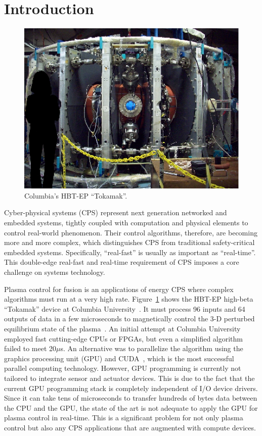 \section{Introduction}
\label{sec:introduction}

\begin{figure}[t]
 \centering
 \includegraphics[width=0.82\hsize]{eps/tokamak.eps}
 \caption{Columbia's HBT-EP ``Tokamak''.}
 \label{fig:tokamak}
\end{figure}

Cyber-physical systems (CPS) represent next generation networked and
embedded systems, tightly coupled with computation and physical
elements to control real-world phenomenon.
Their control algorithms, therefore, are becoming more and more complex,
which distinguishes CPS from traditional safety-critical embedded
systems.
Specifically, ``real-fast'' is usually as important as ``real-time''.
This double-edge real-fast and real-time requirement of CPS imposes a
core challenge on systems technology.

Plasma control for fusion is an applications of energy CPS where
complex algorithms must run at a very high rate.
Figure~\ref{fig:tokamak} shows the HBT-EP high-beta ``Tokamak'' device at
Columbia University~\cite{Maurer_PPCF11,Rath_FED12}.
It must process 96 inputs and 64 outputs of data in a few microseconds
to magnetically control the 3-D perturbed equilibrium state of the
plasma~\cite{Boozer_PP99}.
An initial attempt at Columbia University employed fast cutting-edge
CPUs or FPGAs, but even a simplified algorithm failed to meet 20$\mu$s.
An alternative was to parallelize the algorithm using the
graphics processing unit (GPU) and CUDA~\cite{CUDA}, which is the most
successful parallel computing technology.
However, GPU programming is currently not tailored to integrate
sensor and actuator devices.
This is due to the fact that the current GPU programming stack is
completely independent of I/O device drivers.
Since it can take tens of microseconds to transfer hundreds of bytes
data between the CPU and the GPU, the state of the art is not adequate
to apply the GPU for plasma control in real-time.
This is a significant problem for not only plasma control but also any
CPS applications that are augmented with compute devices.

